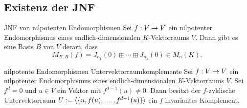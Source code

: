 \documentclass[main.tex]{subfiles}
\begin{document}
\subsection*{Existenz der JNF}

\begin{karte}{JNF von nilpotenten Endomorphismen}
    Sei \(f : V \rightarrow V\) ein nilpotenter Endomorphismus eines endlich-dimensionalen
    \(K\)-Vektorraums \(V\). Dann gibt es eine Basis \(B\) von \(V\) derart, dass
    \[ M_{B,B}(f) = J_{n_1}(0) \boxplus \cdots \boxplus J_{n_k}(0) \in M_n(K). \]
\end{karte}

\begin{karte}{nilpotente Endomorphismen Untervektorraumkomplemente}
    Sei \(f : V \rightarrow V\) ein nilpotenter Endomorphismus eines endlich-dimensionalen
    \(K\)-Vektorraums \(V\). Sei \(f^d = 0\) und \(u \in V\) ein Vektor mit
    \(f^{d-1}(u) \neq 0\). Dann besitzt der \(f\)-zyklische Untervektorraum
    \(U := \langle \{u, f(u), \ldots, f^{d-1}(u)\}\rangle\) ein \(f\)-invariantes
    Komplement.
\end{karte}
\end{document}
